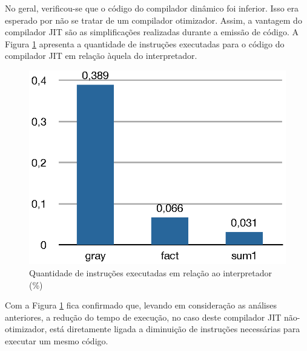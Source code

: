 No geral, verificou-se que o código do compilador dinâmico foi
inferior. Isso era esperado por não se tratar de um compilador otimizador.
Assim, a vantagem do compilador JIT são as simplificações realizadas
durante a emissão de código. A Figura \ref{fig:instrelative} apresenta
a quantidade de instruções executadas para o código do compilador JIT
em relação àquela do interpretador.

\begin{figure}[ht!]
  \centering
  \includegraphics[scale=0.70]{figs/instrelative}
  \caption{Quantidade de instruções executadas em relação ao
    interpretador (\%) \label{fig:instrelative}}
\end{figure}

Com a Figura \ref{fig:instrelative} fica confirmado que,
levando em consideração as análises
anteriores, a redução do
tempo de execução, no caso deste compilador JIT não-otimizador, está
diretamente ligada a
diminuição de instruções necessárias para executar um mesmo
código.
